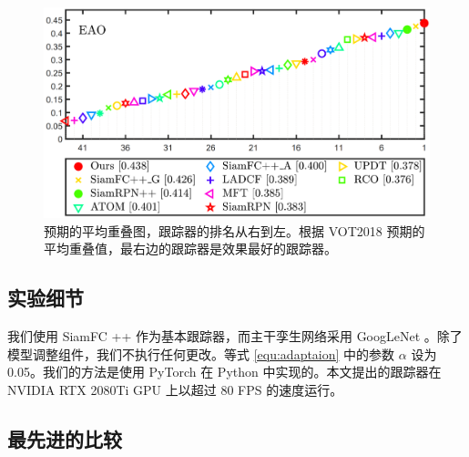 \begin{figure}[t]
    \centering
    \includegraphics[width=1.0\textwidth]{Img/MTP/vot18/vot18_eao.png}
    \caption{预期的平均重叠图，跟踪器的排名从右到左。根据 VOT2018 预期的平均重叠值，最右边的跟踪器是效果最好的跟踪器。}
    \label{fig:eao}
\end{figure}

\subsection{实验细节}
我们使用 SiamFC ++ \cite{SiamFC++} 作为基本跟踪器，而主干孪生网络采用 GoogLeNet \cite{GoogLeNet}。除了模型调整组件，我们不执行任何更改。等式 \ref{equ:adaptaion} 中的参数 $\alpha$ 设为 0.05。我们的方法是使用 PyTorch 在 Python 中实现的。本文提出的跟踪器在 NVIDIA RTX 2080Ti GPU 上以超过 80 FPS 的速度运行。

\subsection{最先进的比较}

